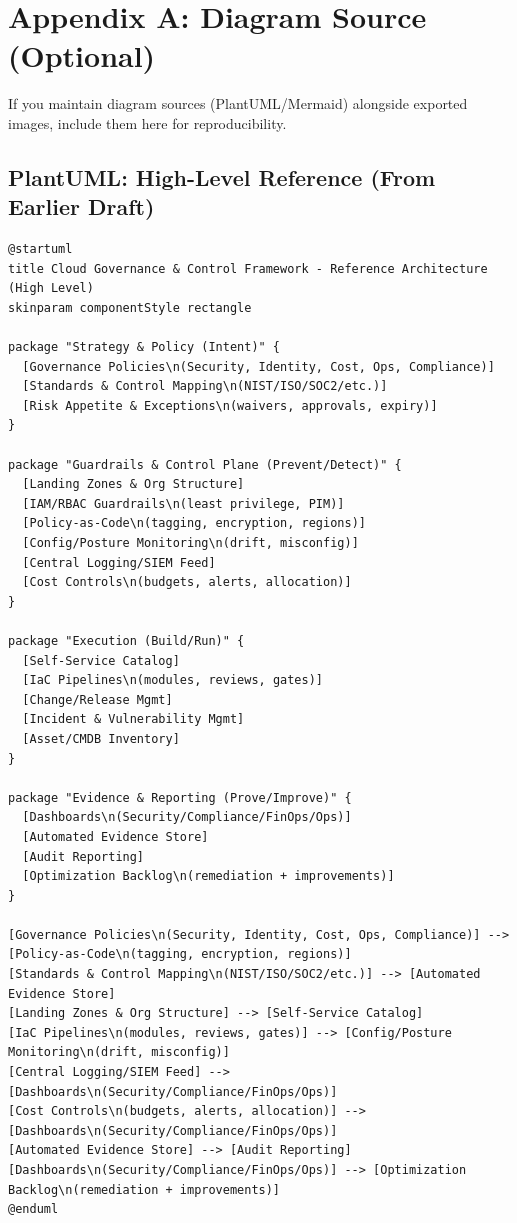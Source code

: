 \documentclass[11pt]{report}
\begin{document}
\clearpage

\appendix
\chapter{Appendix A: Diagram Source (Optional)}
If you maintain diagram sources (PlantUML/Mermaid) alongside exported images, include them here
for reproducibility.

\section{PlantUML: High-Level Reference (From Earlier Draft)}
\begin{verbatim}
@startuml
title Cloud Governance & Control Framework - Reference Architecture (High Level)
skinparam componentStyle rectangle

package "Strategy & Policy (Intent)" {
  [Governance Policies\n(Security, Identity, Cost, Ops, Compliance)]
  [Standards & Control Mapping\n(NIST/ISO/SOC2/etc.)]
  [Risk Appetite & Exceptions\n(waivers, approvals, expiry)]
}

package "Guardrails & Control Plane (Prevent/Detect)" {
  [Landing Zones & Org Structure]
  [IAM/RBAC Guardrails\n(least privilege, PIM)]
  [Policy-as-Code\n(tagging, encryption, regions)]
  [Config/Posture Monitoring\n(drift, misconfig)]
  [Central Logging/SIEM Feed]
  [Cost Controls\n(budgets, alerts, allocation)]
}

package "Execution (Build/Run)" {
  [Self-Service Catalog]
  [IaC Pipelines\n(modules, reviews, gates)]
  [Change/Release Mgmt]
  [Incident & Vulnerability Mgmt]
  [Asset/CMDB Inventory]
}

package "Evidence & Reporting (Prove/Improve)" {
  [Dashboards\n(Security/Compliance/FinOps/Ops)]
  [Automated Evidence Store]
  [Audit Reporting]
  [Optimization Backlog\n(remediation + improvements)]
}

[Governance Policies\n(Security, Identity, Cost, Ops, Compliance)] --> [Policy-as-Code\n(tagging, encryption, regions)]
[Standards & Control Mapping\n(NIST/ISO/SOC2/etc.)] --> [Automated Evidence Store]
[Landing Zones & Org Structure] --> [Self-Service Catalog]
[IaC Pipelines\n(modules, reviews, gates)] --> [Config/Posture Monitoring\n(drift, misconfig)]
[Central Logging/SIEM Feed] --> [Dashboards\n(Security/Compliance/FinOps/Ops)]
[Cost Controls\n(budgets, alerts, allocation)] --> [Dashboards\n(Security/Compliance/FinOps/Ops)]
[Automated Evidence Store] --> [Audit Reporting]
[Dashboards\n(Security/Compliance/FinOps/Ops)] --> [Optimization Backlog\n(remediation + improvements)]
@enduml
\end{verbatim}
\end{document}
